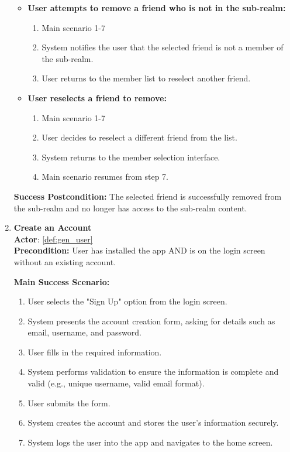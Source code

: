 \documentclass{article}
\begin{document}
\begin{enumerate}[label=\textbf{UC\arabic*}]
\begin{itemize}
              \item[{}] \textbf{User attempts to remove a friend who is not in the sub-realm:}
                  \begin{enumerate}[label=\textbf{\arabic*.}]
                      \item Main scenario 1-7
                      \item System notifies the user that the selected friend is not a member of the sub-realm.
                      \item User returns to the member list to reselect another friend.
                  \end{enumerate}

              \item[{}] \textbf{User reselects a friend to remove:}
                  \begin{enumerate}[label=\textbf{\arabic*.}]
                      \item Main scenario 1-7
                      \item User decides to reselect a different friend from the list.
                      \item System returns to the member selection interface.
                      \item Main scenario resumes from step 7.
                  \end{enumerate}
          \end{itemize}

          \textbf{Success Postcondition:} The selected friend is successfully removed from the sub-realm and no longer has access to the sub-realm content.

    \item \label{uc:23} \textbf{Create an Account} \\
          \textbf{Actor}: \ref{def:gen_user} \\
          \textbf{Precondition:} User has installed the app AND is on the login screen without an existing account.

          \textbf{Main Success Scenario:}
          \begin{enumerate}[label=\textbf{\arabic*.}]
              \item User selects the "Sign Up" option from the login screen.
              \item System presents the account creation form, asking for details such as email, username, and password.
              \item User fills in the required information.
              \item System performs validation to ensure the information is complete and valid (e.g., unique username, valid email format).
              \item User submits the form.
              \item System creates the account and stores the user’s information securely.
              \item System logs the user into the app and navigates to the home screen.
          \end{enumerate}


\end{enumerate}
\end{document}
